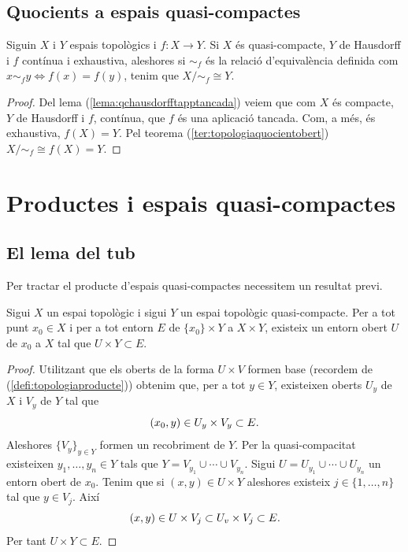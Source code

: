 \documentclass[../main.tex]{subfiles}
\begin{document}
\subsection{Quocients a espais quasi-compactes}

\begin{ter}
\label{ter:quocientqc} Siguin $X$ i $Y$ espais topològics i $f:X\rightarrow Y$. Si $X$ és quasi-compacte, $Y$ de Hausdorff i $f$ contínua i exhaustiva, aleshores si $\sim_f$ és la relació d'equivalència definida com $x\sim_f y\Leftrightarrow f(x)=f(y)$, tenim que $X/\sim_f\cong Y$.
\end{ter}
\begin{proof}
Del lema (\ref{lema:qchausdorfftapptancada}) veiem que com $X$ és compacte, $Y$ de Hausdorff i $f$, contínua, que $f$ és una aplicació tancada. Com, a més, és exhaustiva, $f(X) = Y$. Pel teorema (\ref{ter:topologiaquocientobert}) $X/\sim_f\cong f(X) = Y$.
\end{proof}

\section{Productes i espais quasi-compactes}
\subsection{El lema del tub}

Per tractar el producte d'espais quasi-compactes necessitem un resultat previ.

\begin{lema}
\label{lema:lemadeltub} Sigui $X$ un espai topològic i sigui $Y$ un espai topològic quasi-compacte. Per a tot punt $x_0\in X$ i per a tot entorn $E$ de $\{x_0\}\times Y$ a $X\times Y$, existeix un entorn obert $U$ de $x_0$ a $X$ tal que $U\times Y\subset E$.
\end{lema}
\begin{proof}
Utilitzant que els oberts de la forma $U\times V$ formen base (recordem de (\ref{defi:topologiaproducte})) obtenim que, per a tot $y\in Y$, existeixen oberts $U_y$ de $X$ i $V_y$ de $Y$ tal que 
\begin{equation}
    \notag
    (x_0,y)\in U_y\times V_y\subset E.
\end{equation}
Aleshores $\{V_y\}_{y\in Y}$ formen un recobriment de $Y$. Per la quasi-compacitat existeixen $y_1,\ldots,y_n\in Y$ tals que $Y = V_{y_1}\cup\cdots\cup V_{y_n}$. Sigui $U = U_{y_1}\cup\cdots\cup U_{y_n}$ un entorn obert de $x_0$. Tenim que si $(x,y)\in U\times Y$ aleshores existeix $j\in\{1,\ldots,n\}$ tal que $y\in V_j$. Així 
\begin{equation}
    \notag
    (x,y)\in U\times V_j\subset U_v\times V_j\subset E.
\end{equation}
Per tant $U\times Y\subset E$.
\end{proof}
\end{document}
